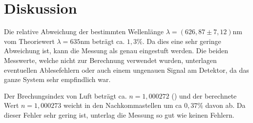 \section{Diskussion}
\label{sec:Diskussion}

Die relative Abweichung der bestimmten Wellenlänge $\lambda =  (626,87 \pm 7,12) \si{\nano\meter}$ vom Theoriewert $\lambda = 635 \si{\nano\meter}$ beträgt ca. $1,3 \%$.
Da dies eine sehr geringe Abweichung ist, kann die Messung als genau eingestuft werden. Die beiden Messwerte, welche nicht zur Berechnung verwendet wurden, unterlagen eventuellen Ablesefehlern oder auch einem ungenauen Signal am Detektor, da das ganze System sehr empfindlich war.

\noindent Der Brechungsindex von Luft beträgt ca. $n = 1,000272$ (\cite{sample1}) und der berechnete Wert $n = 1,000273$ weicht in den Nachkommastellen um ca $0,37 \%$ davon ab. Da dieser Fehler sehr gering ist, unterlag die Messung so gut wie keinen Fehlern.